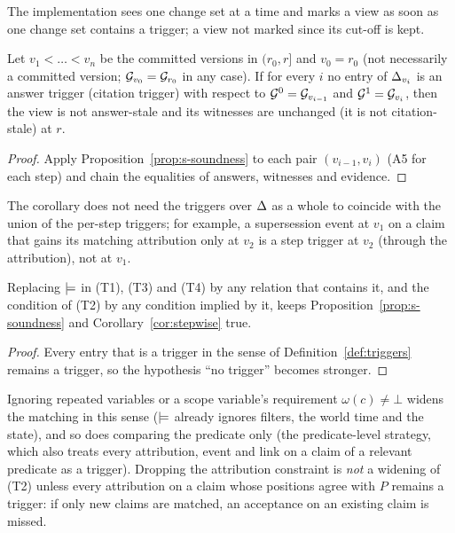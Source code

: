 The implementation sees one change set at a time and marks a view as soon as one change set
contains a trigger; a view not marked since its cut-off is kept.

\begin{corollary}\label{cor:stepwise}
Let $v_1<\dots<v_n$ be the committed versions in $(r_0,r]$ and $v_0=r_0$ (not necessarily a
committed version; $\mathcal G_{v_0}=\mathcal G_{r_0}$ in any case). If for every $i$ no entry of
$\Delta_{v_i}$ is an answer trigger (citation trigger) with respect to $\mathcal G^0=\mathcal G_{v_{i-1}}$ and
$\mathcal G^1=\mathcal G_{v_i}$, then the view is not answer-stale and its witnesses are unchanged (it is not
citation-stale) at $r$.
\end{corollary}
\begin{proof}
Apply Proposition~\ref{prop:s-soundness} to each pair $(v_{i-1},v_i)$ (A5 for each step) and chain
the equalities of answers, witnesses and evidence.
\end{proof}

\noindent The corollary does not need the triggers over $\Delta$ as a whole to coincide with the
union of the per-step triggers; for example, a supersession event at $v_1$ on a claim that gains
its matching attribution only at $v_2$ is a step trigger at $v_2$ (through the attribution), not
at $v_1$.

\begin{corollary}\label{cor:wider}
Replacing $\models$ in (T1), (T3) and (T4) by any relation that contains it, and the condition of
(T2) by any condition implied by it, keeps Proposition~\ref{prop:s-soundness} and
Corollary~\ref{cor:stepwise} true.
\end{corollary}
\begin{proof}
Every entry that is a trigger in the sense of Definition~\ref{def:triggers} remains a trigger, so
the hypothesis ``no trigger'' becomes stronger.
\end{proof}

\noindent Ignoring repeated variables or a scope variable's requirement $\omega(c)\neq\bot$ widens
the matching in this sense ($\models$ already ignores filters, the world time and the state), and
so does comparing the predicate only (the predicate-level strategy, which also treats every attribution, event and link
on a claim of a relevant predicate as a trigger). Dropping the attribution constraint is
\emph{not} a widening of (T2) unless every attribution on a claim whose positions agree with $P$
remains a trigger: if only new claims are matched, an acceptance on an existing claim is missed.

